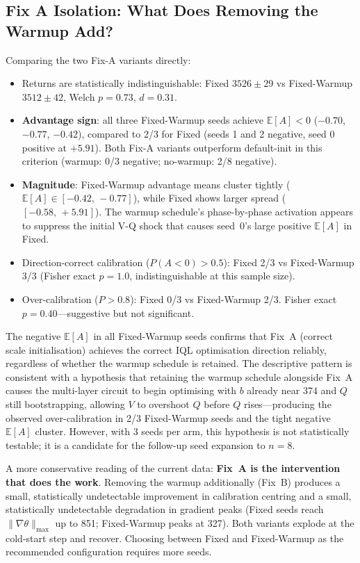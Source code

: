 \documentclass[10pt,a4paper]{article}
\begin{document}
\subsection{Fix A Isolation: What Does Removing the Warmup Add?}

Comparing the two Fix-A variants directly:

\begin{itemize}
  \item Returns are statistically indistinguishable: Fixed $3526\pm29$
        vs Fixed-Warmup $3512\pm42$, Welch $p=0.73$, $d=0.31$.
  \item \textbf{Advantage sign}: all three Fixed-Warmup seeds achieve
        $\mathbb{E}[A]<0$ ($-0.70$, $-0.77$, $-0.42$), compared to 2/3 for
        Fixed (seeds 1 and 2 negative, seed 0 positive at $+5.91$).
        Both Fix-A variants outperform default-init in this criterion
        (warmup: 0/3 negative; no-warmup: 2/8 negative).
  \item \textbf{Magnitude}: Fixed-Warmup advantage means cluster tightly
        ($\mathbb{E}[A]\in[-0.42,\,-0.77]$), while Fixed shows larger spread
        ($[-0.58,\,+5.91]$). The warmup schedule's phase-by-phase activation
        appears to suppress the initial V-Q shock that causes seed~0's
        large positive $\mathbb{E}[A]$ in Fixed.
  \item Direction-correct calibration ($P(A{<}0)>0.5$): Fixed 2/3 vs
        Fixed-Warmup 3/3 (Fisher exact $p=1.0$, indistinguishable at this
        sample size).
  \item Over-calibration ($P>0.8$): Fixed 0/3 vs Fixed-Warmup 2/3.
        Fisher exact $p=0.40$---suggestive but not significant.
\end{itemize}

The negative $\mathbb{E}[A]$ in all Fixed-Warmup seeds confirms that Fix~A
(correct scale initialisation) achieves the correct IQL optimisation
direction reliably, regardless of whether the warmup schedule is retained.
The descriptive pattern is consistent with a hypothesis that retaining the
warmup schedule alongside Fix~A causes the multi-layer circuit to begin
optimising with $b$ already near 374 and $Q$ still bootstrapping, allowing
$V$ to overshoot $Q$ before $Q$ rises---producing the observed
over-calibration in 2/3 Fixed-Warmup seeds and the tight negative $\mathbb{E}[A]$
cluster. However, with 3 seeds per arm,
this hypothesis is not statistically testable; it is a candidate for the
follow-up seed expansion to $n=8$.

A more conservative reading of the current data: \textbf{Fix~A is the
intervention that does the work}. Removing the warmup additionally (Fix~B)
produces a small, statistically undetectable improvement in calibration
centring and a small, statistically undetectable degradation in gradient
peaks (Fixed seeds reach $\|\nabla\theta\|_\text{max}$ up to 851; Fixed-Warmup
peaks at 327). Both variants explode at the cold-start step and recover.
Choosing between Fixed and Fixed-Warmup as the recommended configuration
requires more seeds.
\end{document}
